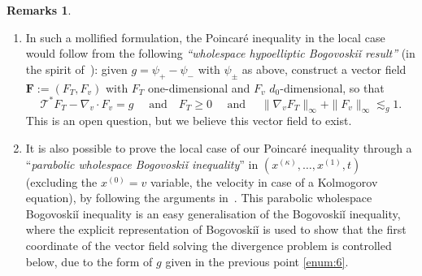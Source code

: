\documentclass[JEP,XML,SOM,Unicode,NoFloatCountersInSection,published]{cedram}
\theoremstyle{definition}
\newtheorem{remarks}[theorem]{Remarks}
\newcommand{\cT}{{\mathcal T}}
\renewcommand{\vec}[1]{\boldsymbol{#1}}
\begin{document}
\begin{remarks}
\begin{enumerate}
\item\label{enum:6} In such a mollified formulation, the Poincaré inequality
in the local case would follow from the following
\textit{``wholespace hypoelliptic Bogovoskiǐ result''} (in the spirit
of~\cite{MR553920}): given $g=\psi_+-\psi_-$ with $\psi_\pm$
as above, construct a vector field $\vec{F}:= (F_T,F_{v})$
with $F_T$ one-dimensional and $F_{v}$ $d_0$-dimensional,
so that\vspace*{-3pt}
\begin{equation*}
\cT^* F_T - \nabla_{v} \cdot F_{v} = g \quad \text{ and
} \quad F_T \ge 0 \quad \text{ and } \quad \| \nabla_{v}
F_T \|_\infty + \| F_{v} \|_\infty \lesssim_g 1.
\end{equation*}
This is an open question, but we believe this vector field to
exist.

\item It is also possible to prove the local case of our
Poincaré inequality through a ``\emph{parabolic wholespace
Bogovoskiǐ inequality}'' in
$(x^{(\kappa)},\dots,x^{(1)}, t)$ (excluding the $x^{(0)}=v$
variable, \ie the velocity in case of a Kolmogorov
equation), by following the arguments
in~\cite{dietert2023quantitative}. This parabolic wholespace
Bogovoskiǐ inequality is an easy generalisation of the
Bogovoskiǐ inequality, where the explicit representation of
Bogovoskiǐ is used to show that the first coordinate of the
vector field solving the divergence problem is controlled
below, due to the form of $g$ given in the previous point \eqref{enum:6}.
\end{enumerate}
\end{remarks}
\end{document}
